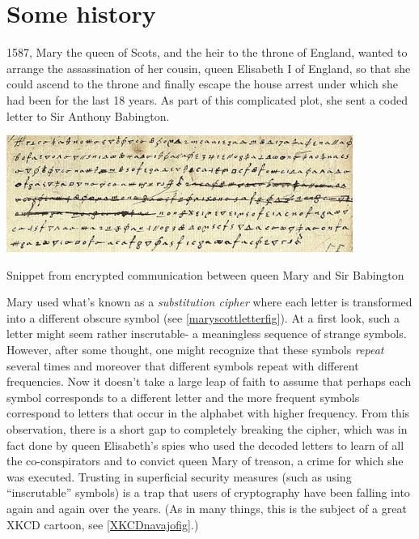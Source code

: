 \section{Some history}\label{Some-history}

1587, Mary the queen of Scots, and the heir to the throne of England,
wanted to arrange the assassination of her cousin, queen Elisabeth I of
England, so that she could ascend to the throne and finally escape the
house arrest under which she had been for the last 18 years. As part of
this complicated plot, she sent a coded letter to Sir Anthony Babington.


\begin{marginfigure}
\centering
\includegraphics[width=\linewidth, height=1.5in, keepaspectratio]{../figure/encrypted_letter.jpg}
\caption{Snippet from encrypted communication between queen Mary and Sir
Babington}
\label{maryscottletterfig}
\end{marginfigure}

Mary used what's known as a \emph{substitution cipher} where each letter
is transformed into a different obscure symbol (see
\cref{maryscottletterfig}). At a first look, such a letter might seem
rather inscrutable- a meaningless sequence of strange symbols. However,
after some thought, one might recognize that these symbols \emph{repeat}
several times and moreover that different symbols repeat with different
frequencies. Now it doesn't take a large leap of faith to assume that
perhaps each symbol corresponds to a different letter and the more
frequent symbols correspond to letters that occur in the alphabet with
higher frequency. From this observation, there is a short gap to
completely breaking the cipher, which was in fact done by queen
Elisabeth's spies who used the decoded letters to learn of all the
co-conspirators and to convict queen Mary of treason, a crime for which
she was executed. Trusting in superficial security measures (such as
using ``inscrutable'' symbols) is a trap that users of cryptography have
been falling into again and again over the years. (As in many things,
this is the subject of a great XKCD cartoon, see \cref{XKCDnavajofig}.)


